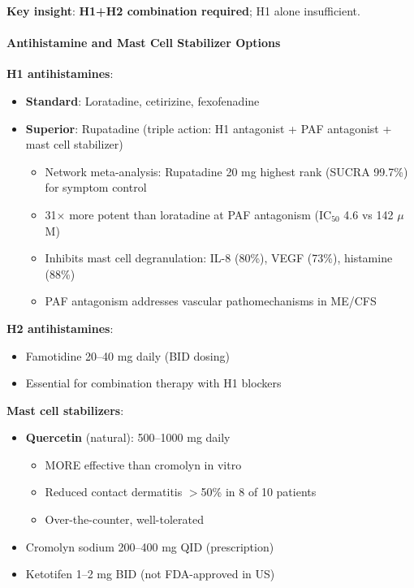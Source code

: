 \textbf{Key insight}: \textbf{H1+H2 combination required}; H1 alone insufficient.

\paragraph{Antihistamine and Mast Cell Stabilizer Options}

\textbf{H1 antihistamines}:
\begin{itemize}
    \item \textbf{Standard}: Loratadine, cetirizine, fexofenadine
    \item \textbf{Superior}: Rupatadine (triple action: H1 antagonist + PAF antagonist + mast cell stabilizer)~\cite{Pinero-Gonzalez2024,Mullol2008}
    \begin{itemize}
        \item Network meta-analysis: Rupatadine 20 mg highest rank (SUCRA 99.7\%) for symptom control
        \item 31$\times$ more potent than loratadine at PAF antagonism (IC$_{50}$ 4.6 vs 142 $\mu$M)
        \item Inhibits mast cell degranulation: IL-8 (80\%), VEGF (73\%), histamine (88\%)
        \item PAF antagonism addresses vascular pathomechanisms in ME/CFS
    \end{itemize}
\end{itemize}

\textbf{H2 antihistamines}:
\begin{itemize}
    \item Famotidine 20--40 mg daily (BID dosing)
    \item Essential for combination therapy with H1 blockers
\end{itemize}

\textbf{Mast cell stabilizers}:
\begin{itemize}
    \item \textbf{Quercetin} (natural): 500--1000 mg daily
    \begin{itemize}
        \item MORE effective than cromolyn in vitro~\cite{Theoharides2012}
        \item Reduced contact dermatitis $>$50\% in 8 of 10 patients
        \item Over-the-counter, well-tolerated
    \end{itemize}
    \item Cromolyn sodium 200--400 mg QID (prescription)
    \item Ketotifen 1--2 mg BID (not FDA-approved in US)
\end{itemize}

